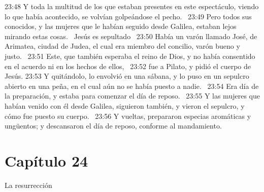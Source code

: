 23:48 Y toda la multitud de los que estaban presentes en este espectáculo, viendo lo que había acontecido, se volvían golpeándose el pecho.  
23:49 Pero todos sus conocidos, y las mujeres que le habían seguido desde Galilea, estaban lejos mirando estas cosas.  
Jesús es sepultado   
23:50 Había un varón llamado José, de Arimatea, ciudad de Judea, el cual era miembro del concilio, varón bueno y justo.  
23:51 Este, que también esperaba el reino de Dios, y no había consentido en el acuerdo ni en los hechos de ellos,  
23:52 fue a Pilato, y pidió el cuerpo de Jesús. 
23:53 Y quitándolo, lo envolvió en una sábana, y lo puso en un sepulcro abierto en una peña, en el cual aún no se había puesto a nadie.  
23:54 Era día de la preparación, y estaba para comenzar el día de reposo.  
23:55 Y las mujeres que habían venido con él desde Galilea, siguieron también, y vieron el sepulcro, y cómo fue puesto su cuerpo.  
23:56 Y vueltas, prepararon especias aromáticas y ungüentos; y descansaron el día de reposo, conforme al mandamiento. 
\section*{Capítulo 24 }
La resurrección    

